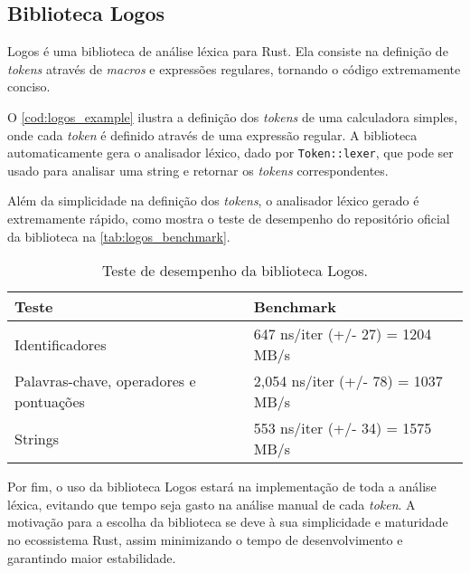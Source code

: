 \subsection{Biblioteca Logos}

Logos é uma biblioteca de análise léxica para Rust. Ela consiste na definição de \textit{tokens} através de \textit{macros} e expressões regulares, tornando o código extremamente conciso.

O \autoref{cod:logos_example} ilustra a definição dos \textit{tokens} de uma calculadora simples, onde cada \textit{token} é definido através de uma expressão regular. A biblioteca automaticamente gera o analisador léxico, dado por \texttt{Token::lexer}, que pode ser usado para analisar uma string e retornar os \textit{tokens} correspondentes.


\vspace{-1em}

Além da simplicidade na definição dos \textit{tokens}, o analisador léxico gerado é extremamente rápido, como mostra o teste de desempenho do repositório oficial da biblioteca na \autoref{tab:logos_benchmark}.

\begin{table}
	\centering
	\caption{Teste de desempenho da biblioteca Logos.}
	{
		\begin{tabular}{ll}
			\hline
			\textbf{Teste}                          & \textbf{Benchmark}                 \\ \hline
			Identificadores                         & 647 ns/iter (+/- 27) = 1204 MB/s   \\
			Palavras-chave, operadores e pontuações & 2,054 ns/iter (+/- 78) = 1037 MB/s \\
			Strings                                 & 553 ns/iter (+/- 34) = 1575 MB/s   \\ \hline
		\end{tabular}
	}
	\label{tab:logos_benchmark}
\end{table}

Por fim, o uso da biblioteca Logos estará na implementação de toda a análise léxica, evitando que tempo seja gasto na análise manual de cada \textit{token}. A motivação para a escolha da biblioteca se deve à sua simplicidade e maturidade no ecossistema Rust, assim minimizando o tempo de desenvolvimento e garantindo maior estabilidade.
